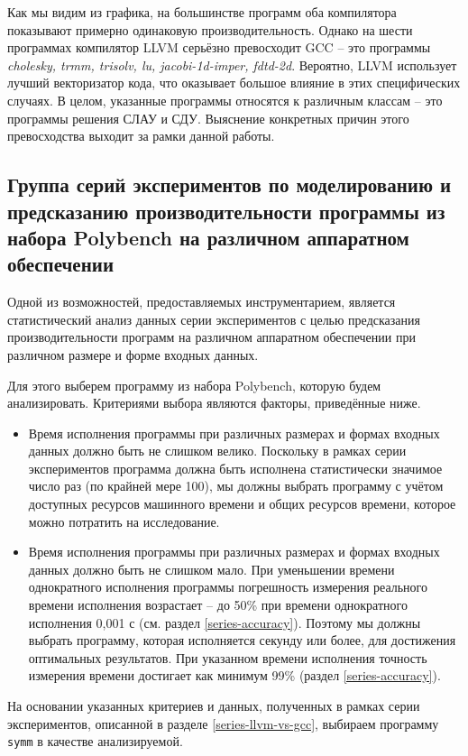 Как мы видим из графика, на большинстве программ оба компилятора показывают примерно одинаковую производительность. Однако на шести программах компилятор LLVM серьёзно превосходит GCC -- это программы \textit{cholesky, trmm, trisolv, lu, jacobi-1d-imper, fdtd-2d}. Вероятно, LLVM использует лучший векторизатор кода, что оказывает большое влияние в этих специфических случаях. В целом, указанные программы относятся к различным классам -- это программы решения СЛАУ и СДУ. Выяснение конкретных причин этого превосходства выходит за рамки данной работы.

\subsection{Группа серий экспериментов по моделированию и предсказанию производительности программы из набора Polybench на различном аппаратном обеспечении}

Одной из возможностей, предоставляемых инструментарием, является статистический анализ данных серии экспериментов с целью предсказания производительности программ на различном аппаратном обеспечении при различном размере и форме входных данных.

Для этого выберем программу из набора Polybench, которую будем анализировать. Критериями выбора являются факторы, приведённые ниже.
\begin{itemize}
    \item Время исполнения программы при различных размерах и формах входных данных должно быть не слишком велико. Поскольку в рамках серии экспериментов программа должна быть исполнена статистически значимое число раз (по крайней мере 100), мы должны выбрать программу с учётом доступных ресурсов машинного времени и общих ресурсов времени, которое можно потратить на исследование.
    \item Время исполнения программы при различных размерах и формах входных данных должно быть не слишком мало. При уменьшении времени однократного исполнения программы погрешность измерения реального времени исполнения возрастает -- до 50\% при времени однократного исполнения 0,001 с (см. раздел \ref{series-accuracy}). Поэтому мы должны выбрать программу, которая исполняется секунду или более, для достижения оптимальных результатов. При указанном времени исполнения точность измерения времени достигает как минимум 99\% (раздел \ref{series-accuracy}).
\end{itemize}

На основании указанных критериев и данных, полученных в рамках серии экспериментов, описанной в разделе \ref{series-llvm-vs-gcc}, выбираем программу \texttt{symm} в качестве анализируемой.

